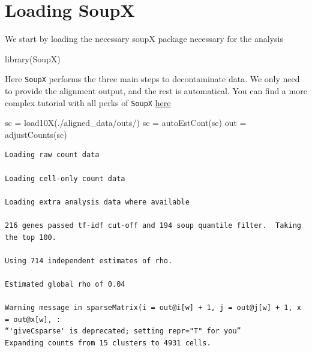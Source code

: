 \documentclass[
  letterpaper,
  DIV=11,
  numbers=noendperiod]{scrartcl}
\newenvironment{Shaded}{\begin{snugshade}}{\end{snugshade}}
\newcommand{\FunctionTok}[1]{\textcolor[rgb]{0.28,0.35,0.67}{#1}}
\newcommand{\NormalTok}[1]{\textcolor[rgb]{0.00,0.23,0.31}{#1}}
\newcommand{\OtherTok}[1]{\textcolor[rgb]{0.00,0.23,0.31}{#1}}
\newcommand{\StringTok}[1]{\textcolor[rgb]{0.13,0.47,0.30}{#1}}
\begin{document}
\section{Loading SoupX}\label{loading-soupx}

We start by loading the necessary soupX package necessary for the
analysis

\begin{Shaded}
\begin{Highlighting}[]
\FunctionTok{library}\NormalTok{(SoupX)}
\end{Highlighting}
\end{Shaded}

Here \texttt{SoupX} performs the three main steps to decontaminate data.
We only need to provide the alignment output, and the rest is
automatical. You can find a more complex tutorial with all perks of
\texttt{SoupX}
\href{https://github.com/constantAmateur/SoupX/blob/master/vignettes/pbmcTutorial.Rmd}{here}

\begin{Shaded}
\begin{Highlighting}[]
\NormalTok{sc }\OtherTok{=} \FunctionTok{load10X}\NormalTok{(}\StringTok{\textquotesingle{}./aligned\_data/outs/\textquotesingle{}}\NormalTok{)}
\NormalTok{sc }\OtherTok{=} \FunctionTok{autoEstCont}\NormalTok{(sc)}
\NormalTok{out }\OtherTok{=} \FunctionTok{adjustCounts}\NormalTok{(sc)}
\end{Highlighting}
\end{Shaded}

\begin{verbatim}
Loading raw count data

Loading cell-only count data

Loading extra analysis data where available

216 genes passed tf-idf cut-off and 194 soup quantile filter.  Taking the top 100.

Using 714 independent estimates of rho.

Estimated global rho of 0.04

Warning message in sparseMatrix(i = out@i[w] + 1, j = out@j[w] + 1, x = out@x[w], :
“'giveCsparse' is deprecated; setting repr="T" for you”
Expanding counts from 15 clusters to 4931 cells.
\end{verbatim}
\end{document}
